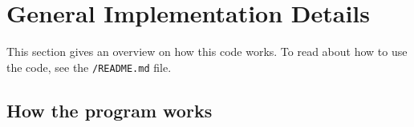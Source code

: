 \newpage



\section{General Implementation Details}


This section gives an overview on how this code works.
To read about how to use the code, see the \verb|/README.md| file.



\subsection{How the program works}

